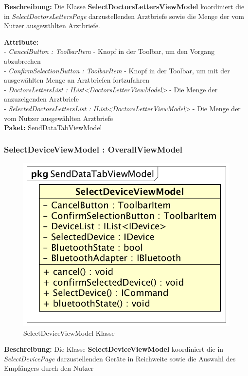\documentclass[a4paper]{scrreprt}
\begin{document}
\textbf{Beschreibung:} Die Klasse \textbf{SelectDoctorsLettersViewModel} koordiniert die in \textit{SelectDoctorsLettersPage} darzustellenden Arztbriefe sowie die Menge der vom Nutzer ausgewählten Arztbriefe.

\textbf{Attribute:}\\
- \textit{CancelButton : ToolbarItem} - Knopf in der Toolbar, um den Vorgang abzubrechen\\
- \textit{ConfirmSelectionButton : ToolbarItem} - Knopf in der Toolbar, um mit der ausgewählten Menge an Arztbriefen fortzufahren\\
- \textit{DoctorsLettersList : IList<DoctorsLetterViewModel>} - Die Menge der anzuzeigenden Arztbriefe\\
- \textit{SelectedDoctorsLettersList : IList<DoctorsLetterViewModel>} - Die Menge der vom Nutzer ausgewählten Arztbriefe\\

\textbf{Paket:} SendDataTabViewModel

\subsubsection{SelectDeviceViewModel : OverallViewModel}
\begin{figure}[H]
\centering
\includegraphics[width=0.45\textheight]{graphics/Klassendiagramme/ViewModel/SelectDeviceViewModel.png}
\caption{SelectDeviceViewModel Klasse}
\end{figure}

\textbf{Beschreibung:} Die Klasse \textbf{SelectDeviceViewModel} koordiniert die in \textit{SelectDevicePage} darzustellenden Geräte in Reichweite sowie die Auswahl des Empfängers durch den Nutzer
\end{document}
